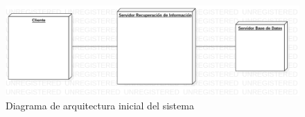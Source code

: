 \begin{figure}[ht]
	
	\centering
	\includegraphics[width=\linewidth]{imagenes/initial_architecture}
	\caption{Diagrama de arquitectura inicial del sistema}

\end{figure}